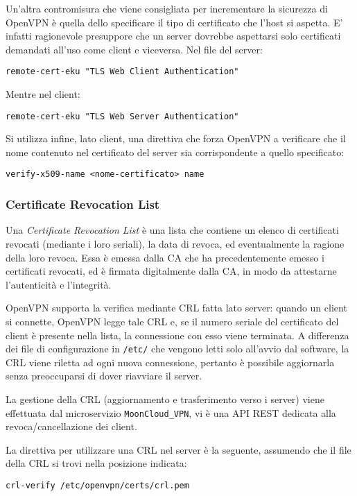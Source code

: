 Un'altra contromisura che viene consigliata per incrementare la sicurezza di OpenVPN
è quella dello specificare il tipo di certificato che l'host si aspetta.
E' infatti ragionevole presuppore che un server dovrebbe aspettarsi solo certificati
demandati all'uso come client e viceversa.
Nel file del server:
\begin{verbatim}
remote-cert-eku "TLS Web Client Authentication"
\end{verbatim}
Mentre nel client:
\begin{verbatim}
remote-cert-eku "TLS Web Server Authentication"
\end{verbatim}


Si utilizza infine, lato client, una direttiva che forza OpenVPN a verificare che
il nome contenuto nel certificato del server sia corrispondente a quello specificato:
\begin{verbatim}
verify-x509-name <nome-certificato> name  
\end{verbatim}


\subsubsection{Certificate Revocation List}
Una \textit{Certificate Revocation List} è una lista che contiene un elenco di certificati
revocati (mediante i loro seriali), la data di revoca, ed eventualmente la ragione della loro revoca.
Essa è emessa dalla CA che ha precedentemente emesso i certificati revocati, ed è firmata digitalmente
dalla CA, in modo da attestarne l'autenticità e l'integrità.

OpenVPN supporta la verifica mediante CRL fatta lato server: quando
un client si connette, OpenVPN legge tale CRL e, se il numero seriale del certificato
del client è presente nella lista, la connessione con esso viene terminata.
A differenza dei file di configurazione in \texttt{/etc/} che vengono letti solo all'avvio
dal software, la CRL viene riletta ad ogni nuova connessione, pertanto è possibile aggiornarla senza
preoccuparsi di dover riavviare il server.

La gestione della CRL (aggiornamento e trasferimento verso i server) viene effettuata dal microservizio
\texttt{MoonCloud\_VPN}, vi è una API REST dedicata alla revoca/cancellazione dei client.

La direttiva per utilizzare una CRL nel server è la seguente, assumendo che il file della CRL
si trovi nella posizione indicata:
\begin{verbatim}
crl-verify /etc/openvpn/certs/crl.pem
\end{verbatim}